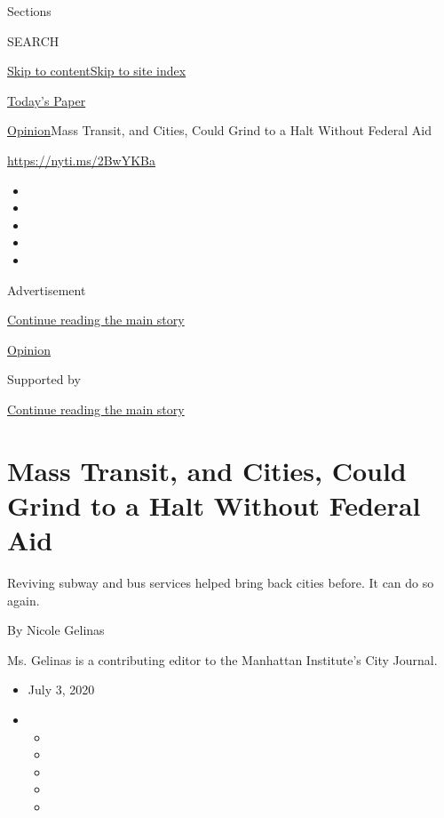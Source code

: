 Sections

SEARCH

\protect\hyperlink{site-content}{Skip to
content}\protect\hyperlink{site-index}{Skip to site index}

\href{https://myaccount.nytimes.com/auth/login?response_type=cookie\&client_id=vi}{}

\href{https://www.nytimes.com/section/todayspaper}{Today's Paper}

\href{/section/opinion}{Opinion}\textbar{}Mass Transit, and Cities,
Could Grind to a Halt Without Federal Aid

\href{https://nyti.ms/2BwYKBa}{https://nyti.ms/2BwYKBa}

\begin{itemize}
\item
\item
\item
\item
\item
\end{itemize}

Advertisement

\protect\hyperlink{after-top}{Continue reading the main story}

\href{/section/opinion}{Opinion}

Supported by

\protect\hyperlink{after-sponsor}{Continue reading the main story}

\hypertarget{mass-transit-and-cities-could-grind-to-a-halt-without-federal-aid}{%
\section{Mass Transit, and Cities, Could Grind to a Halt Without Federal
Aid}\label{mass-transit-and-cities-could-grind-to-a-halt-without-federal-aid}}

Reviving subway and bus services helped bring back cities before. It can
do so again.

By Nicole Gelinas

Ms. Gelinas is a contributing editor to the Manhattan Institute's City
Journal.

\begin{itemize}
\item
  July 3, 2020
\item
  \begin{itemize}
  \item
  \item
  \item
  \item
  \item
  \end{itemize}
\end{itemize}

